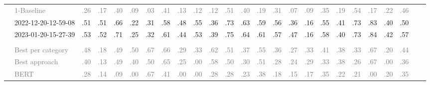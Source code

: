 \begin{table*}
\begin{tabular}{@{}ll@{\hspace{10pt}}c@{\hspace{5pt}}cccccccccccccccccccccc@{}}
& \textcolor{gray}{1-Baseline} & \textcolor{gray}{.26} & \textcolor{gray}{.17} & \textcolor{gray}{.40} & \textcolor{gray}{.09} & \textcolor{gray}{.03} & \textcolor{gray}{.41} & \textcolor{gray}{.13} & \textcolor{gray}{.12} & \textcolor{gray}{.12} & \textcolor{gray}{.51} & \textcolor{gray}{.40} & \textcolor{gray}{.19} & \textcolor{gray}{.31} & \textcolor{gray}{.07} & \textcolor{gray}{.09} & \textcolor{gray}{.35} & \textcolor{gray}{.19} & \textcolor{gray}{.54} & \textcolor{gray}{.17} & \textcolor{gray}{.22} & \textcolor{gray}{.46} \\
& 2022-12-20-12-59-08 & .51 & .51 & .66 & .22 & .31 & .58 & .48 & .55 & .36 & .73 & .63 & .59 & .56 & .36 & .16 & .55 & .41 & .73 & .83 & .40 & .50 \\
& 2023-01-20-15-27-39 & .53 & .52 & .71 & .25 & .32 & .61 & .44 & .53 & .39 & .75 & .64 & .61 & .57 & .47 & .16 & .58 & .40 & .73 & .84 & .42 & .57 \\
\addlinespace
\multicolumn{2}{@{}l}{\emph{Nahj al-Balagha}} \\
& \textcolor{gray}{Best per category} & \textcolor{gray}{.48} & \textcolor{gray}{.18} & \textcolor{gray}{.49} & \textcolor{gray}{.50} & \textcolor{gray}{.67} & \textcolor{gray}{.66} & \textcolor{gray}{.29} & \textcolor{gray}{.33} & \textcolor{gray}{.62} & \textcolor{gray}{.51} & \textcolor{gray}{.37} & \textcolor{gray}{.55} & \textcolor{gray}{.36} & \textcolor{gray}{.27} & \textcolor{gray}{.33} & \textcolor{gray}{.41} & \textcolor{gray}{.38} & \textcolor{gray}{.33} & \textcolor{gray}{.67} & \textcolor{gray}{.20} & \textcolor{gray}{.44} \\
& \textcolor{gray}{Best approach} & \textcolor{gray}{.40} & \textcolor{gray}{.13} & \textcolor{gray}{.49} & \textcolor{gray}{.40} & \textcolor{gray}{.50} & \textcolor{gray}{.65} & \textcolor{gray}{.25} & \textcolor{gray}{.00} & \textcolor{gray}{.58} & \textcolor{gray}{.50} & \textcolor{gray}{.30} & \textcolor{gray}{.51} & \textcolor{gray}{.28} & \textcolor{gray}{.24} & \textcolor{gray}{.29} & \textcolor{gray}{.33} & \textcolor{gray}{.38} & \textcolor{gray}{.26} & \textcolor{gray}{.67} & \textcolor{gray}{.00} & \textcolor{gray}{.36} \\
& \textcolor{gray}{BERT} & \textcolor{gray}{.28} & \textcolor{gray}{.14} & \textcolor{gray}{.09} & \textcolor{gray}{.00} & \textcolor{gray}{.67} & \textcolor{gray}{.41} & \textcolor{gray}{.00} & \textcolor{gray}{.00} & \textcolor{gray}{.28} & \textcolor{gray}{.28} & \textcolor{gray}{.23} & \textcolor{gray}{.38} & \textcolor{gray}{.18} & \textcolor{gray}{.15} & \textcolor{gray}{.17} & \textcolor{gray}{.35} & \textcolor{gray}{.22} & \textcolor{gray}{.21} & \textcolor{gray}{.00} & \textcolor{gray}{.20} & \textcolor{gray}{.35} \\

\end{tabular}
\end{table*}
